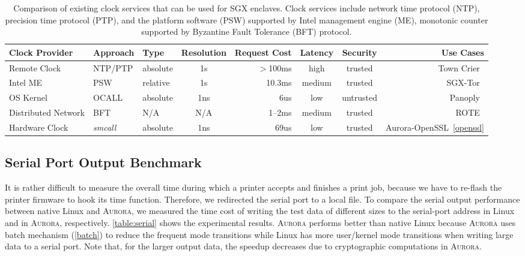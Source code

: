 \documentclass[journal,twocolumn,letterpaper,10pt]{IEEEtran}
\begin{document}
\begin{table}[t]
	\centering
	\caption{Comparison of existing clock services that can be used for SGX enclaves. Clock services include network time protocol (NTP), precision time protocol (PTP), and the platform software (PSW) supported by Intel management engine (ME), monotonic counter supported by Byzantine Fault Tolerance (BFT) protocol.}
	\label{table:timeservice}
	\small
	\begin{tabular}{lllcrccr}
		\toprule
		\textbf{Clock Provider} & \textbf{Approach} & \textbf{Type} & \textbf{Resolution} & \textbf{Request Cost} & \textbf{Latency} & \textbf{Security} & \textbf{Use Cases} \\
		\midrule
		Remote Clock & NTP/PTP & absolute & 1s & $>$100ms & high & trusted & Town Crier~\cite{DBLP:conf/ccs/ZhangCCJS16} \\
		Intel ME & PSW & relative & 1s & 10.3ms & medium & trusted & SGX-Tor~\cite{DBLP:conf/nsdi/KimHHKH17} \\
		OS Kernel & OCALL & absolute & 1ns & 6us & low & untrusted & Panoply~\cite{shinde_panoply:_2017} \\
		Distributed Network & BFT & N/A & N/A & 1--2ms & medium & trusted & ROTE~\cite{DBLP:conf/uss/MateticAKDSGJC17} \\
		Hardware Clock & \textit{smcall} & absolute & 1ns & 69us & low & trusted & Aurora-OpenSSL~\ref{openssl} \\
		\bottomrule
	\end{tabular}
\end{table}

\fi

\subsection{Serial Port Output Benchmark}

It is rather difficult to measure the overall time during which a printer accepts and finishes a print job, because we have to re-flash the printer firmware to hook its time function. Therefore, we redirected the serial port to a local file. 
To compare the serial output performance between native Linux and \textsc{Aurora}, we measured the time cost of writing the test data of different sizes to the serial-port address in Linux and in \textsc{Aurora}, respectively. \autoref{table:serial} shows the experimental results. \textsc{Aurora} performs better than native Linux because \textsc{Aurora} uses batch mechanism (\autoref{batch}) to reduce the frequent mode transitions while Linux has more user/kernel mode transitions when writing large data to a serial port. Note that, for the larger output data, the speedup decreases due to cryptographic computations in \textsc{Aurora}.
\end{document}
